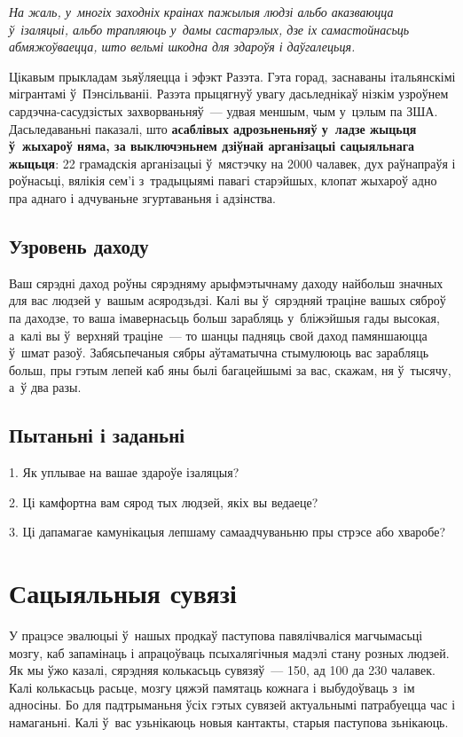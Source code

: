 \emph{На жаль, у~многіх заходніх краінах пажылыя людзі альбо аказваюцца ў~ізаляцыі, альбо трапляюць у~дамы састарэлых, дзе іх самастойнасьць абмяжоўваецца, што вельмі шкодна для здароўя і даўгалецьця.}

Цікавым прыкладам зьяўляецца і эфэкт Разэта. Гэта горад, заснаваны італьянскімі мігрантамі ў~Пэнсільваніі. Разэта прыцягнуў увагу дасьледнікаў нізкім узроўнем сардэчна-сасудзістых захворваньняў~--- удвая меншым, чым у~цэлым па ЗША. Дасьледаваньні паказалі, што \textbf{асаблівых адрозьненьняў у~ладзе жыцьця ў~жыхароў няма, за выключэньнем дзіўнай арганізацыі сацыяльнага жыцьця}: 22 грамадскія арганізацыі ў~мястэчку на 2000 чалавек, дух раўнапраўя і роўнасьці, вялікія сем'і з~традыцыямі павагі старэйшых, клопат жыхароў адно пра аднаго і адчуваньне згуртаваньня і адзінства.

\subsection*{Узровень даходу}

Ваш сярэдні даход роўны сярэдняму арыфмэтычнаму даходу найбольш значных для вас людзей у~вашым асяродзьдзі. Калі вы ў~сярэдняй траціне вашых сяброў па даходзе, то ваша імавернасьць больш зарабляць у~бліжэйшыя гады высокая, а~калі вы ў~верхняй траціне~--- то шанцы падняць свой даход памяншаюцца ў~шмат разоў. Забясьпечаныя сябры аўтаматычна стымулююць вас зарабляць больш, пры гэтым лепей каб яны былі багацейшымі за вас, скажам, ня ў~тысячу, а~ў два разы.

\subsection*{Пытаньні і заданьні}

1. Як уплывае на вашае здароўе ізаляцыя?

2. Ці камфортна вам сярод тых людзей, якіх вы ведаеце?

3. Ці дапамагае камунікацыя лепшаму самаадчуваньню пры стрэсе або хваробе?


\section{Сацыяльныя сувязі}

У працэсе эвалюцыі ў~нашых продкаў паступова павялічваліся магчымасьці мозгу, каб запамінаць і апрацоўваць псыхалягічныя мадэлі стану розных людзей. Як мы ўжо казалі, сярэдняя колькасьць сувязяў~--- 150, ад 100 да 230 чалавек. Калі колькасьць расьце, мозгу цяжэй памятаць кожнага і выбудоўваць з~ім адносіны. Бо для падтрыманьня ўсіх гэтых сувязей актуальнымі патрабуецца час і намаганьні. Калі ў~вас узьнікаюць новыя кантакты, старыя паступова зьнікаюць.


